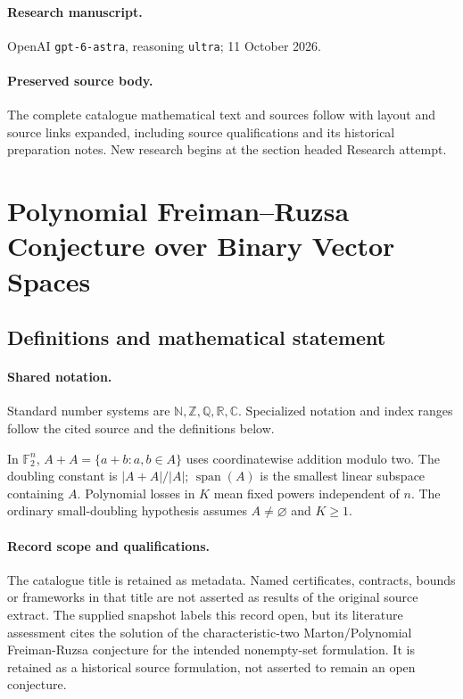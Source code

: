 \documentclass[11pt]{article}
\begin{document}
\paragraph{Research manuscript.} OpenAI \texttt{gpt-6-astra}, reasoning \texttt{ultra}; 11 October 2026.
\paragraph{Preserved source body.} The complete catalogue mathematical text and sources follow with layout and source links expanded, including source qualifications and its historical preparation notes. New research begins at the section headed Research attempt.

\section{Polynomial Freiman–Ruzsa Conjecture over Binary Vector Spaces}\label{statement}

\subsection{Definitions and mathematical statement}

\paragraph{Shared notation.}Standard number systems are $\mathbb N,\mathbb Z,\mathbb Q,\mathbb R,\mathbb C$. Specialized notation and index ranges follow the cited source and the definitions below.


In $\mathbb F_2^n$, $A+A=\{a+b:a,b\in A\}$ uses coordinatewise addition modulo two. The doubling constant is $|A+A|/|A|$; $\operatorname{span}(A)$ is the smallest linear subspace containing $A$. Polynomial losses in $K$ mean fixed powers independent of $n$. The ordinary small-doubling hypothesis assumes $A\ne\varnothing$ and $K\ge1$.
\paragraph{Record scope and qualifications.}
The catalogue title is retained as metadata. Named certificates, contracts, bounds or frameworks in that title are not asserted as results of the original source extract.
The supplied snapshot labels this record open, but its literature assessment cites the solution of the characteristic-two Marton/Polynomial Freiman-Ruzsa conjecture for the intended nonempty-set formulation. It is retained as a historical source formulation, not asserted to remain an open conjecture.
\end{document}
